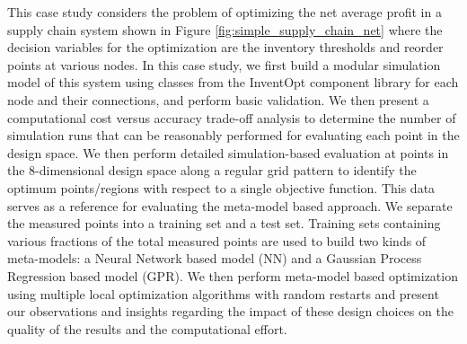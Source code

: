 
This case study considers the problem of optimizing the net average profit in a supply chain system shown in Figure \ref{fig:simple_supply_chain_net} where the decision variables for the optimization are the inventory thresholds and reorder points at various nodes.  In this case study,  we first build a modular simulation model of this system using classes from the InventOpt component library for each node and their connections, and perform basic validation. We then present a computational cost versus accuracy trade-off analysis to determine the number of simulation runs that can be reasonably performed for evaluating each point in the design space.  We then perform detailed simulation-based evaluation at points in the 8-dimensional design space along a regular grid pattern to identify the optimum points/regions with respect to a single objective function. This data serves as a reference for evaluating the meta-model based approach. We separate the measured points into a training set and a test set. Training sets containing various fractions of the total measured points are used to build two kinds of meta-models: a Neural Network based model (NN) and a Gaussian Process Regression based model (GPR). We then perform meta-model based optimization using multiple local optimization algorithms with random restarts and present our observations and insights regarding the impact of these design choices on the quality of the results and the computational effort. 

